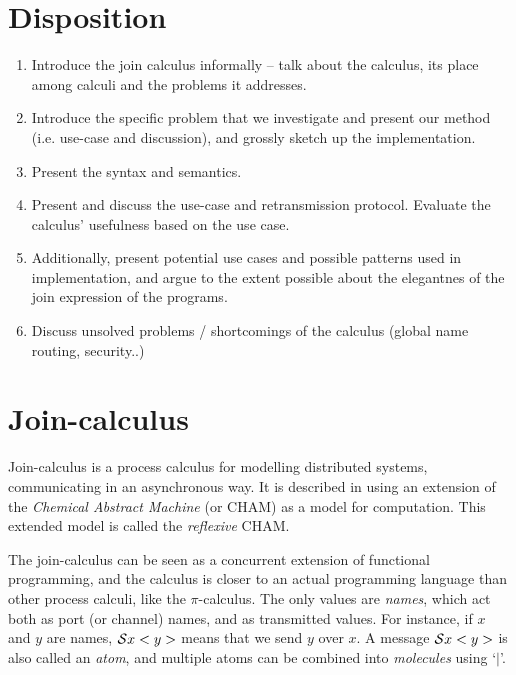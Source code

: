 \section{Disposition}

\begin{enumerate}

\item Introduce the join calculus informally -- talk about the calculus, its
place among calculi and the problems it addresses.

\item Introduce the specific problem that we investigate and present our method
(i.e. use-case and discussion), and grossly sketch up the implementation.

\item Present the syntax and semantics.

\item Present and discuss the use-case and retransmission protocol. Evaluate the calculus' usefulness based on the use case.
\item Additionally, present potential use cases and possible patterns used in implementation, and argue to the extent possible about the elegantnes of the join expression of the programs.

\item Discuss unsolved problems / shortcomings of the calculus (global name
routing, security..)

\end{enumerate}

\section{Join-calculus}

Join-calculus is a process calculus for modelling distributed systems,
communicating in an asynchronous way. It is described in
\cite{fournet1996reflexive} using an extension of the \emph{Chemical Abstract
Machine}\cite{berry1989chemical} (or CHAM) as a model for computation. This
extended model is called the \emph{reflexive} CHAM.

The join-calculus can be seen as a concurrent extension of functional
programming, and the calculus is closer to an actual programming language than
other process calculi, like the $\pi$-calculus. The only values are
\emph{names}, which act both as port (or channel) names, and as transmitted
values. For instance, if $x$ and $y$ are names, $\S x<y>$ means that we send
$y$ over $x$. A message $\S x<y>$ is also called an \emph{atom}, and multiple
atoms can be combined into \emph{molecules} using `$|$'.

